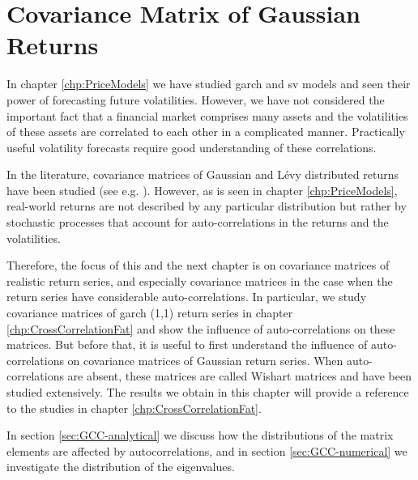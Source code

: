 \chapter{Covariance Matrix of Gaussian Returns}
\label{chp:Gaussian}
In chapter \ref{chp:PriceModels} we have studied \gls{garch} and
\gls{sv} models and seen their power of forecasting future
volatilities. However, we have not considered the important fact that
a financial market comprises many assets and the volatilities of these
assets are correlated to each other in a complicated
manner. Practically useful volatility forecasts require good
understanding of these correlations.

In the literature, covariance matrices of Gaussian and L\'evy
distributed returns have been studied (see e.g. \cite{politi2010,
  Chiani2012, Lalley2013}). However, as is seen in chapter
\ref{chp:PriceModels}, real-world returns are not described by any
particular distribution but rather by stochastic processes that
account for auto-correlations in the returns and the volatilities.

Therefore, the focus of this and the next chapter is on covariance
matrices of realistic return series, and especially covariance matrices
in the case when the return series have considerable
auto-correlations. In particular, we study covariance matrices of
\gls{garch} (1,1) return series in chapter
\ref{chp:CrossCorrelationFat} and show the influence of
auto-correlations on these matrices. But before that, it is useful to
first understand the influence of auto-correlations on covariance
matrices of Gaussian return series. When auto-correlations are absent,
these matrices are called Wishart matrices and have been studied
extensively. The results we obtain in this chapter will provide a
reference to the studies in chapter \ref{chp:CrossCorrelationFat}.



In section \ref{sec:GCC-analytical} we discuss how the distributions
of the matrix elements are affected by autocorrelations, and in
section \ref{sec:GCC-numerical} we investigate the distribution of the
eigenvalues.


